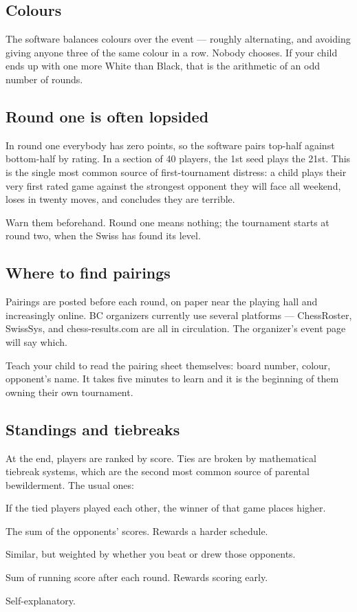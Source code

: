 \documentclass[10pt,letterpaper]{article}
\begin{document}
\subsection{Colours}

The software balances colours over the event --- roughly alternating, and
avoiding giving anyone three of the same colour in a row. Nobody chooses. If
your child ends up with one more White than Black, that is the arithmetic of an
odd number of rounds.

\subsection{Round one is often lopsided}

In round one everybody has zero points, so the software pairs top-half against
bottom-half by rating. In a section of 40 players, the 1st seed plays the 21st.
This is the single most common source of first-tournament distress: a child
plays their very first rated game against the strongest opponent they will face
all weekend, loses in twenty moves, and concludes they are terrible.

Warn them beforehand. Round one means nothing; the tournament starts at round
two, when the Swiss has found its level.

\subsection{Where to find pairings}

Pairings are posted before each round, on paper near the playing hall and
increasingly online. BC organizers currently use several platforms ---
ChessRoster, SwissSys, and chess-results.com are all in circulation. The
organizer's event page will say which.

Teach your child to read the pairing sheet themselves: board number, colour,
opponent's name. It takes five minutes to learn and it is the beginning of them
owning their own tournament.

\subsection{Standings and tiebreaks}

At the end, players are ranked by score. Ties are broken by mathematical
tiebreak systems, which are the second most common source of parental
bewilderment. The usual ones:

\begin{description}[leftmargin=0pt,style=nextline,itemsep=4pt]
  \item[Direct encounter] If the tied players played each other, the winner of
        that game places higher.
  \item[Buchholz] The sum of the opponents' scores. Rewards a harder schedule.
  \item[Sonneborn--Berger] Similar, but weighted by whether you beat or drew
        those opponents.
  \item[Cumulative] Sum of running score after each round. Rewards scoring
        early.
  \item[Average rating of opponents] Self-explanatory.
\end{description}
\end{document}

